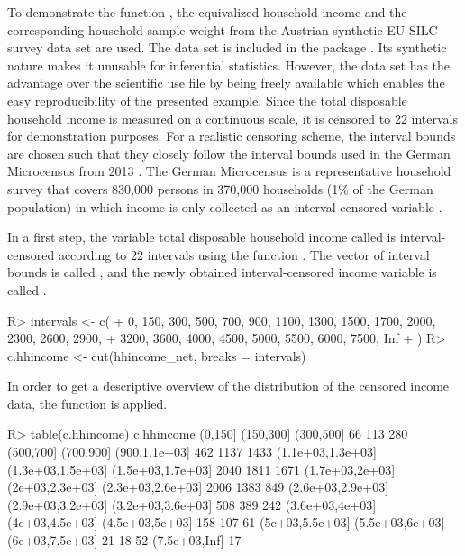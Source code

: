 To demonstrate the function , the  equivalized household income and the corresponding household sample weight from the Austrian synthetic EU-SILC survey data set are used. The data set is included in the  package \citep{Tem20, Tem13}. Its synthetic nature makes it unusable for inferential statistics. However, the data set has the advantage over the scientific use file by being freely available which enables the easy reproducibility of the presented example. Since the total disposable household income is measured on a continuous scale, it is censored to 22 intervals for demonstration purposes. For a realistic censoring scheme, the interval bounds are chosen such that they closely follow the interval bounds used in the German Microcensus from 2013 \citep{Sta14}. The German Microcensus is a representative household survey that covers 830,000 persons in 370,000 households (1\% of the German population) in which income is only collected as an interval-censored variable \citep{Sta16}. 
 
In a first step, the variable total disposable household income called  is interval-censored according to 22 intervals using the function . The vector of interval bounds is called , and  the newly obtained interval-censored income variable is called . 

\begin{example}
R> intervals <- c(
+    0, 150, 300, 500, 700, 900, 1100, 1300, 1500, 1700, 2000, 2300, 2600, 2900, 
+    3200, 3600, 4000, 4500, 5000, 5500, 6000, 7500, Inf
+  )
R> c.hhincome <- cut(hhincome_net, breaks = intervals)
\end{example}

In order to get a descriptive overview of the distribution of the censored income data, the function   is applied.


\begin{example}
R> table(c.hhincome)
c.hhincome
          (0,150]         (150,300]         (300,500] 
               66               113               280 
        (500,700]         (700,900]     (900,1.1e+03] 
              462              1137              1433 
(1.1e+03,1.3e+03] (1.3e+03,1.5e+03] (1.5e+03,1.7e+03] 
             2040              1811              1671 
  (1.7e+03,2e+03]   (2e+03,2.3e+03] (2.3e+03,2.6e+03] 
             2006              1383               849 
(2.6e+03,2.9e+03] (2.9e+03,3.2e+03] (3.2e+03,3.6e+03] 
              508               389               242 
  (3.6e+03,4e+03]   (4e+03,4.5e+03]   (4.5e+03,5e+03] 
              158               107                61 
  (5e+03,5.5e+03]   (5.5e+03,6e+03]   (6e+03,7.5e+03] 
               21                18                52 
    (7.5e+03,Inf]
               17
\end{example}

